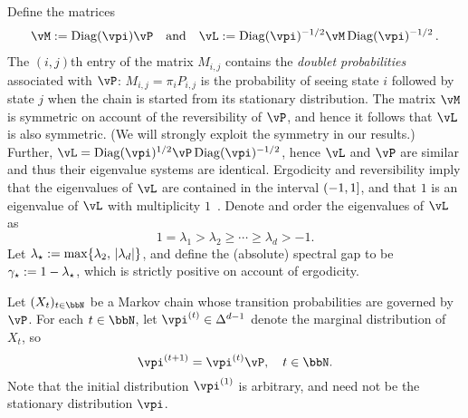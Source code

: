 Define the matrices
\begin{align*}
\vM := \Diag(\vpi) \vP \quad \text{and} \quad
\vL := \Diag(\vpi)^{-1/2} \vM \Diag(\vpi)^{-1/2}\,.
\end{align*}
The $(i,j)$th entry of the matrix $M_{i,j}$ contains the \emph{doublet
probabilities} associated with $\vP$: $M_{i,j} = \pi_i P_{i,j}$ is the
probability of seeing state $i$ followed by state $j$ when the chain
is started from its stationary distribution.
The matrix $\vM$ is symmetric on account of the reversibility of
$\vP$, and hence it follows that $\vL$ is also symmetric.
(We will strongly exploit the symmetry in our results.)
Further, $\vL = \Diag(\vpi)^{1/2} \vP \Diag(\vpi)^{-1/2}$, hence $\vL$
and $\vP$ are similar and thus their eigenvalue systems are identical.
Ergodicity and reversibility imply that the eigenvalues of $\vL$ are
contained in the interval $(-1,1]$, and that $1$ is an
eigenvalue of $\vL$ with multiplicity $1$~\citep[Lemmas 12.1 and
12.2]{LePeWi08}.
Denote and order the eigenvalues of $\vL$ as
\[
  1 = \lambda_1 > \lambda_2 \geq \dotsb \geq \lambda_d > -1 .
\]
Let $\lambda_{\star} := \max\{ \lambda_2,\, |\lambda_d| \}$, and define the
(absolute) spectral gap to be $\gamma_{\star} := 1-\lambda_{\star}$, which is strictly
positive on account of ergodicity.

Let $(X_t)_{t\in\bbN}$ be a Markov chain whose transition
probabilities are governed by $\vP$.
For each $t \in \bbN$, let $\vpi^{(t)} \in \Delta^{d-1}$ denote the
marginal distribution of $X_t$, so
\[
  \vpi^{(t+1)} = \vpi^{(t)} \vP ,
  \quad t \in \bbN .
\]
Note that the initial distribution $\vpi^{(1)}$ is arbitrary,
and need not be the stationary distribution $\vpi$.

